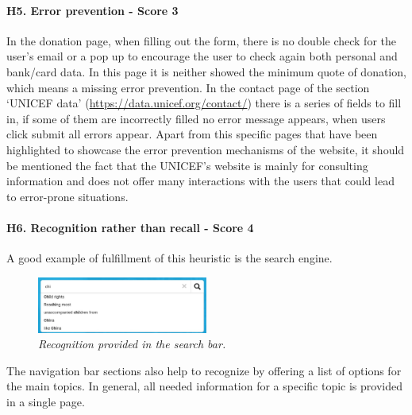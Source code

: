 



\paragraph{H5. Error prevention - Score 3}  \label{subsec:H5}	In the donation page, when filling out the form, there is no double check for the user's email or a pop up to encourage the user to check again both personal and bank/card data.
In this page it is neither showed the minimum quote of donation, which means a missing error prevention.
\newline In the contact page of the section ‘UNICEF data’ (\href {https://data.unicef.org/contact/}{https://data.unicef.org/contact/}) there is a series of fields to fill in, if some of them are incorrectly filled no error message appears, when users click submit all errors appear.
\newline Apart from this specific pages that have been highlighted to showcase the error prevention mechanisms of the website, it should be mentioned the fact that the UNICEF's website is mainly for consulting information and does not offer many interactions with the users that could lead to error-prone situations.
\newline
\newline \paragraph{H6. Recognition rather than recall - Score 4}  \label{subsec:H6}	A good example of fulfillment of this heuristic is the search engine.
\begin{figure}[!h]
	\begin{center}
		\includegraphics[width=0.5\textwidth]{FinalScores12.jpg}
		\captionsetup{font=small}
		\caption{\textit{Recognition provided in the search bar.}}
	\end{center}
\end{figure}
\newline The navigation bar sections also help to recognize by offering a list of options for the main topics. 
\newline In general, all needed information for a specific topic is provided in a single page.
